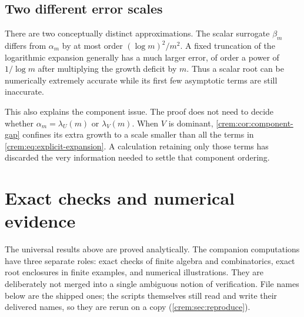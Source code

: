 \documentclass[11pt,a4paper]{article}
\theoremstyle{definition}\newaliascnt{definition}{theorem}
\theoremstyle{remark}\newaliascnt{remark}{theorem}
\begin{document}
\subsection{Two different error scales}
There are two conceptually distinct approximations. The scalar surrogate
$\beta_m$ differs from $\alpha_m$ by at most order $(\log m)^2/m^2$. A fixed
truncation of the logarithmic expansion generally has a much larger error,
of order a power of $1/\log m$ after multiplying the growth deficit by $m$.
Thus a scalar root can be numerically extremely accurate while its first few
asymptotic terms are still inaccurate.

This also explains the component issue. The proof does not need to decide
whether $\alpha_m=\lambda_U(m)$ or $\lambda_V(m)$. When $V$ is dominant,
\cref{crem:cor:component-gap} confines its extra growth to a scale smaller
than all the terms in \eqref{crem:eq:explicit-expansion}. A calculation
retaining only those terms has discarded the very information needed to
settle that component ordering.

\section{Exact checks and numerical evidence}
\label{crem:sec:verification}
The universal results above are proved analytically. The companion
computations have three separate roles: exact checks of finite algebra and
combinatorics, exact root enclosures in finite examples, and numerical
illustrations. They are deliberately not merged into a single ambiguous
notion of verification. File names below are the shipped ones; the scripts
themselves still read and write their delivered names, so they are rerun on
a copy (\cref{crem:sec:reproduce}).
\end{document}

